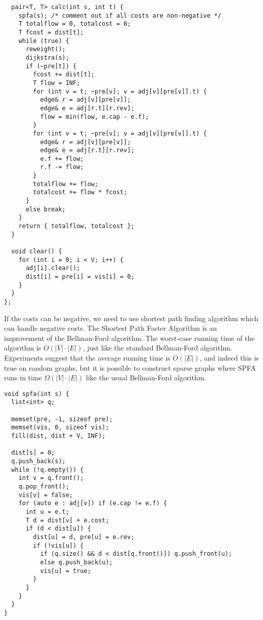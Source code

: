 \begin{center}
\begin{minipage}[t]{0.45\linewidth}
\begin{lstlisting}
  pair<T, T> calc(int s, int t) {
    spfa(s); /* comment out if all costs are non-negative */
    T totalflow = 0, totalcost = 0;
    T fcost = dist[t];
    while (true) {
      reweight();
      dijkstra(s);
      if (~pre[t]) {
        fcost += dist[t];
        T flow = INF;
        for (int v = t; ~pre[v]; v = adj[v][pre[v]].t) {
          edge& r = adj[v][pre[v]];
          edge& e = adj[r.t][r.rev];
          flow = min(flow, e.cap - e.f);
        }
        for (int v = t; ~pre[v]; v = adj[v][pre[v]].t) {
          edge& r = adj[v][pre[v]];
          edge& e = adj[r.t][r.rev];
          e.f += flow;
          r.f -= flow;
        }
        totalflow += flow;
        totalcost += flow * fcost;
      }
      else break;
    }
    return { totalflow, totalcost };
  }

  void clear() {
    for (int i = 0; i < V; i++) {
      adj[i].clear();
      dist[i] = pre[i] = vis[i] = 0;
    }
  }
};
\end{lstlisting}
\end{minipage}
\end{center}

\newpage

If the costs can be negative, we need to use shortest path finding algorithm which can handle
negative costs. The Shortest Path Faster Algorithm is an improvement of the Bellman-Ford algorithm.
The worst-case running time of the algorithm is $\displaystyle O(|V|\cdot |E|)$, 
just like the standard Bellman-Ford algorithm. 
Experiments suggest that the average running time is $\displaystyle O(|E|)$, 
and indeed this is true on random graphs, but it is possible to construct sparse graphs
where SPFA runs in time $\displaystyle \Omega (|V|\cdot |E|)$
like the usual Bellman-Ford algorithm.

\begin{lstlisting}
void spfa(int s) {
  list<int> q;

  memset(pre, -1, sizeof pre);
  memset(vis, 0, sizeof vis);
  fill(dist, dist + V, INF);

  dist[s] = 0;
  q.push_back(s);
  while (!q.empty()) {
    int v = q.front();
    q.pop_front();
    vis[v] = false;
    for (auto e : adj[v]) if (e.cap != e.f) {
      int u = e.t;
      T d = dist[v] + e.cost;
      if (d < dist[u]) {
        dist[u] = d, pre[u] = e.rev;
        if (!vis[u]) {
          if (q.size() && d < dist[q.front()]) q.push_front(u);
          else q.push_back(u);
          vis[u] = true;
        }
      }
    }
  }
}
\end{lstlisting}


